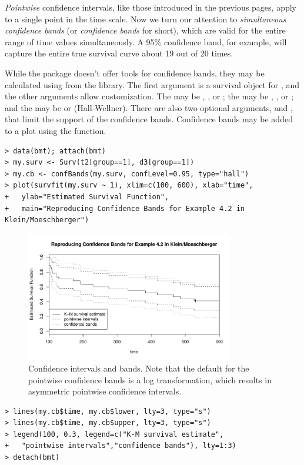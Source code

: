 \documentclass[11pt]{article}
\begin{document}
\emph{Pointwise} confidence intervals, like those introduced in the previous pages, apply to a single point in the time scale. Now we turn our attention to \emph{simultaneous confidence bands} (or \emph{confidence bands} for short), which are valid for the entire range of time values simultaneously. A 95\% confidence band, for example, will capture the entire true survival curve about 19 out of 20 times. 

While the  package doesn't offer tools for confidence bands, they may be calculated using  from the  library. 
The first argument is a survival object for , and the other arguments allow customization. The  may be ,  , or ; the  may be , , or ; and the  may be  or  (Hall-Wellner). There are also two optional arguments,  and , that limit the support of the confidence bands. Confidence bands may be added to a plot using the  function.
{\color{verbatimrcom}\begin{verbatim}
> data(bmt); attach(bmt)
> my.surv <- Surv(t2[group==1], d3[group==1])
> my.cb <- confBands(my.surv, confLevel=0.95, type="hall")
> plot(survfit(my.surv ~ 1), xlim=c(100, 600), xlab="time",
+   ylab="Estimated Survival Function",
+   main="Reproducing Confidence Bands for Example 4.2 in Klein/Moeschberger")
\end{verbatim}}
\begin{figure}[htp]
\centering
\includegraphics[width=0.81\textwidth]{../figures/confBand.pdf} \vspace{-4mm}
\caption{Confidence intervals and bands. Note that the default for the pointwise confidence bands is a log transformation, which results in asymmetric pointwise confidence intervals.}
\end{figure}
{\color{verbatimrcom}\begin{verbatim}
> lines(my.cb$time, my.cb$lower, lty=3, type="s")
> lines(my.cb$time, my.cb$upper, lty=3, type="s")
> legend(100, 0.3, legend=c("K-M survival estimate",
+   "pointwise intervals","confidence bands"), lty=1:3)
> detach(bmt)
\end{verbatim}}
\end{document}
